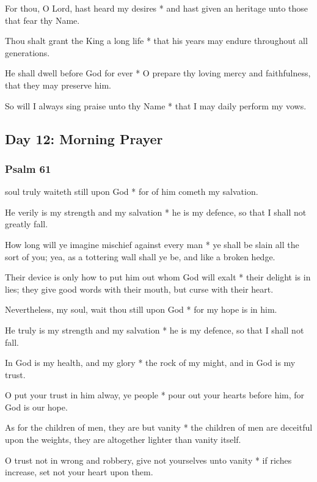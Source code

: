 For thou, O Lord, hast heard my desires * and hast given an heritage unto those that fear thy Name.

Thou shalt grant the King a long life * that his years may endure throughout all generations.

He shall dwell before God for ever * O prepare thy loving mercy and faithfulness, that they may preserve him.

So will I always sing praise unto thy Name * that I may daily perform my vows.

\subsection{Day 12: Morning Prayer}

\subsubsection{Psalm 61}


 soul truly waiteth still upon God * for of him cometh my salvation.

He verily is my strength and my salvation * he is my defence, so that I shall not greatly fall.

How long will ye imagine mischief against every man * ye shall be slain all the sort of you; yea, as a tottering wall shall ye be, and like a broken hedge.

Their device is only how to put him out whom God will exalt * their delight is in lies; they give good words with their mouth, but curse with their heart.

Nevertheless, my soul, wait thou still upon God * for my hope is in him.

He truly is my strength and my salvation * he is my defence, so that I shall not fall.

In God is my health, and my glory * the rock of my might, and in God is my trust.

O put your trust in him alway, ye people * pour out your hearts before him, for God is our hope.

As for the children of men, they are but vanity * the children of men are deceitful upon the weights, they are altogether lighter than vanity itself.

O trust not in wrong and robbery, give not yourselves unto vanity * if riches increase, set not your heart upon them.

